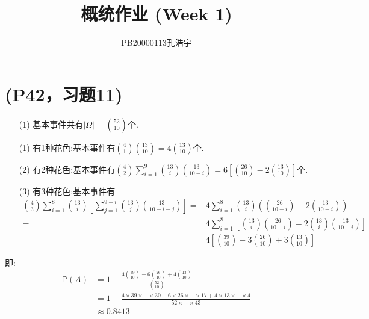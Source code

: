 \documentclass{article}
\title{概统作业 (Week 1)}
\author{PB20000113孔浩宇}
\begin{document}
\maketitle
\section{(P42，习题11)}
        \begin{enumerate}
            \item []
            \item [(1)]基本事件共有$|\Omega |=\displaystyle{\binom{52}{10}}$个.
            \item [(1)]有1种花色:基本事件有$\displaystyle{\binom{4}{1} \binom{13}{10}=4 \binom{13}{10}}$个.
            \item [(2)]有2种花色:基本事件有$\displaystyle{\binom{4}{2} \sum\limits_{i=1}^{9} \binom{13}{i} \binom{13}{10-i}=6 \left[\binom{26}{10}-2 \binom{13}{10}\right]}$个.
            \item [(3)]有3种花色:基本事件有
            \begin{align*}
                \binom{4}{3} \sum\limits_{i=1}^{8} \binom{13}{i} \left[\sum\limits_{j=1}^{9-i} \binom{13}{j} \binom{13}{10-i-j}\right]
                = & 4 \sum\limits_{i=1}^{8} \binom{13}{i} \left( \binom{26}{10-i} - 2 \binom{13}{10-i} \right)\\
                = & 4 \sum\limits_{i=1}^{8} \left[\binom{13}{i}\binom{26}{10-i} - 2 \binom{13}{i} \binom{13}{10-i}  \right] \\
                = & 4 \left[\binom{39}{10}-3\binom{26}{10}+3\binom{13}{10}\right]
            \end{align*}
        \end{enumerate}
        即:
        \begin{align*}
            \mathbb{P} (A)&=1-\displaystyle{\frac{\displaystyle{4 \binom{39}{10}-6 \binom{26}{10}+4 \binom{13}{10}}}{\displaystyle{\binom{52}{10}}}}\\
            &=1-\displaystyle{\frac{4\times 39 \times \cdots \times 30 -6\times 26 \times \cdots \times 17+4\times 13 \times \cdots \times 4}{52\times \cdots \times 43}}\\
            &\approx 0.8413
        \end{align*}
\end{document}
